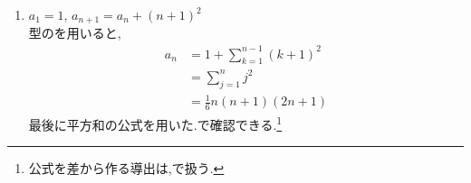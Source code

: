 \begin{enumerate}[label=(\arabic*),parsep=3pt,format=\bookitemlink{example-difference-1}{solution}{problem}]
      \item $\displaystyle a_1=1,\,a_{n+1}=a_n+(n+1)^2$\\
            型のを用いると,
            \begin{align*}
              a_n
                &=1+\sum_{k=1}^{n-1}(k+1)^2\\
                &=\sum_{j=1}^{n}j^2\\
                &=\frac{1}{6}n(n+1)(2n+1)
            \end{align*}
            最後に平方和の公式を用いた.で確認できる.\footnote{公式を差から作る導出は,で扱う.}
    \end{enumerate}
